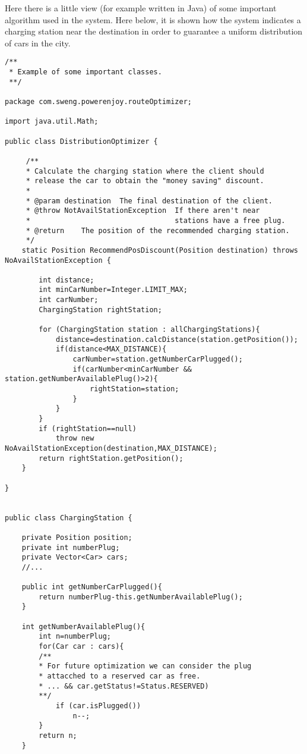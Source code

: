 Here there is a little view (for example written in Java) of some important algorithm used in the system.
Here below, it is shown how the system indicates a charging station near the destination in order to guarantee a uniform distribution of cars in the city.\\

\begin{lstlisting}
/**
 * Example of some important classes.
 **/

package com.sweng.powerenjoy.routeOptimizer;

import java.util.Math;

public class DistributionOptimizer {

     /** 
     * Calculate the charging station where the client should 
     * release the car to obtain the "money saving" discount.
     *
     * @param destination  The final destination of the client.
     * @throw NotAvailStationException  If there aren't near 
     *                                  stations have a free plug.
     * @return    The position of the recommended charging station.
     */
    static Position RecommendPosDiscount(Position destination) throws NoAvailStationException {
    
        int distance;
        int minCarNumber=Integer.LIMIT_MAX;
        int carNumber;
        ChargingStation rightStation;
        
        for (ChargingStation station : allChargingStations){
            distance=destination.calcDistance(station.getPosition());
            if(distance<MAX_DISTANCE){
                carNumber=station.getNumberCarPlugged();
                if(carNumber<minCarNumber && station.getNumberAvailablePlug()>2){
                    rightStation=station;
                }
            }
        }
        if (rightStation==null)
            throw new NoAvailStationException(destination,MAX_DISTANCE);
        return rightStation.getPosition();
    }
    
}


public class ChargingStation {

    private Position position;
    private int numberPlug;
    private Vector<Car> cars;
    //...
    
    public int getNumberCarPlugged(){
        return numberPlug-this.getNumberAvailablePlug();
    }
    
    int getNumberAvailablePlug(){
    	int n=numberPlug;
    	for(Car car : cars){
        /**
        * For future optimization we can consider the plug 
        * attacched to a reserved car as free.
        * ... && car.getStatus!=Status.RESERVED)
        **/
        	if (car.isPlugged())
            	n--;
        }
        return n;
    }


\end{lstlisting}
